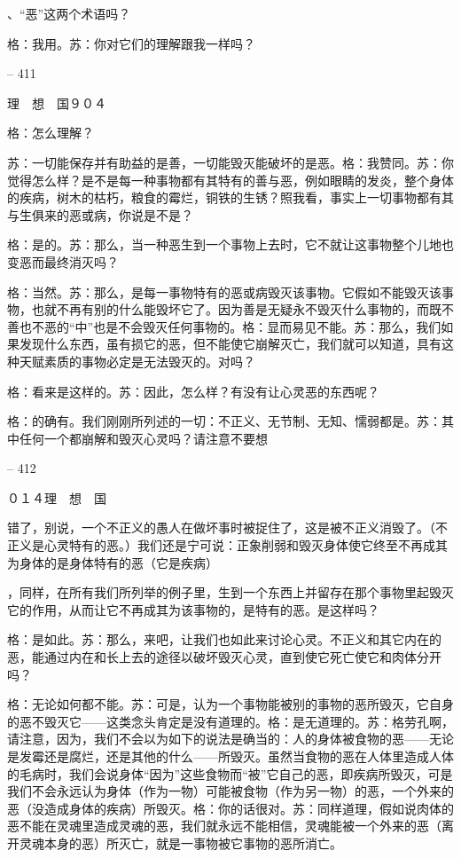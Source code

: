 \documentclass[11pt,oneside]{book}
\begin{document}
\begin{common-format}
    、“恶”这两个术语吗？

    格：我用。苏：你对它们的理解跟我一样吗？

    

-- 411

    理　想　国９０４

    格：怎么理解？

    苏：一切能保存并有助益的是善，一切能毁灭能破坏的是恶。格：我赞同。苏：你觉得怎么样？是不是每一种事物都有其特有的善与恶，例如眼睛的发炎，整个身体的疾病，树木的枯朽，粮食的霉烂，铜铁的生锈？照我看，事实上一切事物都有其与生俱来的恶或病，你说是不是？

    格：是的。苏：那么，当一种恶生到一个事物上去时，它不就让这事物整个儿地也变恶而最终消灭吗？

    格：当然。苏：那么，是每一事物特有的恶或病毁灭该事物。它假如不能毁灭该事物，也就不再有别的什么能毁坏它了。因为善是无疑永不毁灭什么事物的，而既不善也不恶的“中”也是不会毁灭任何事物的。格：显而易见不能。苏：那么，我们如果发现什么东西，虽有损它的恶，但不能使它崩解灭亡，我们就可以知道，具有这种天赋素质的事物必定是无法毁灭的。对吗？

    格：看来是这样的。苏：因此，怎么样？有没有让心灵恶的东西呢？

    格：的确有。我们刚刚所列述的一切：不正义、无节制、无知、懦弱都是。苏：其中任何一个都崩解和毁灭心灵吗？请注意不要想

    

-- 412

    ０１４理　想　国

    错了，别说，一个不正义的愚人在做坏事时被捉住了，这是被不正义消毁了。（不正义是心灵特有的恶。）我们还是宁可说：正象削弱和毁灭身体使它终至不再成其为身体的是身体特有的恶（它是疾病）

    ，同样，在所有我们所列举的例子里，生到一个东西上并留存在那个事物里起毁灭它的作用，从而让它不再成其为该事物的，是特有的恶。是这样吗？

    格：是如此。苏：那么，来吧，让我们也如此来讨论心灵。不正义和其它内在的恶，能通过内在和长上去的途径以破坏毁灭心灵，直到使它死亡使它和肉体分开吗？

    格：无论如何都不能。苏：可是，认为一个事物能被别的事物的恶所毁灭，它自身的恶不毁灭它——这类念头肯定是没有道理的。格：是无道理的。苏：格劳孔啊，请注意，因为，我们不会以为如下的说法是确当的：人的身体被食物的恶——无论是发霉还是腐烂，还是其他的什么——所毁灭。虽然当食物的恶在人体里造成人体的毛病时，我们会说身体“因为”这些食物而“被”它自己的恶，即疾病所毁灭，可是我们不会永远认为身体（作为一物）可能被食物（作为另一物）的恶，一个外来的恶（没造成身体的疾病）所毁灭。格：你的话很对。苏：同样道理，假如说肉体的恶不能在灵魂里造成灵魂的恶，我们就永远不能相信，灵魂能被一个外来的恶（离开灵魂本身的恶）所灭亡，就是一事物被它事物的恶所消亡。


\end{common-format}
\end{document}
